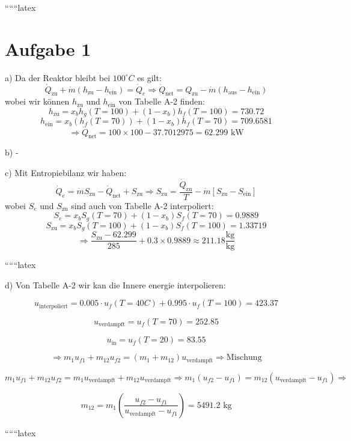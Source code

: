 
``````latex


\section*{Aufgabe 1}

a) Da der Reaktor bleibt bei \(100^\circ C\) es gilt:
\[
\dot{Q}_{\text{zu}} + \dot{m} (h_{\text{zu}} - h_{\text{ein}}) = \dot{Q}_e \Rightarrow \dot{Q}_{\text{net}} = Q_{\text{zu}} - \dot{m} (h_{\text{aus}} - h_{\text{ein}})
\]
wobei wir können \(h_{\text{zu}}\) und \(h_{\text{ein}}\) von Tabelle A-2 finden:
\[
h_{\text{zu}} = x_b h_g (T = 100) + (1 - x_b) h_f (T = 100) = 730.72
\]
\[
h_{\text{ein}} = x_b (h_f (T = 70)) + (1 - x_b) h_f (T = 70) = 709.6581
\]
\[
\Rightarrow \dot{Q}_{\text{net}} = 100 \times 100 - 37.7012975 = \boxed{62.299 \text{ kW}}
\]

b) -

c) Mit Entropiebilanz wir haben:
\[
\dot{Q}_e = \dot{m} S_{\text{zu}} - \dot{Q}_{\text{net}} + S_{\text{zu}} \Rightarrow S_{\text{zu}} = \frac{\dot{Q}_{\text{zu}}}{T} - \dot{m} [S_{\text{zu}} - S_{\text{ein}}]
\]
wobei \(S_e\) und \(S_{\text{zu}}\) sind auch von Tabelle A-2 interpoliert:
\[
S_e = x_b S_g (T = 70) + (1 - x_b) S_f (T = 70) = 0.9889
\]
\[
S_{\text{zu}} = x_b S_g (T = 100) + (1 - x_b) S_f (T = 100) = 1.33719
\]
\[
\Rightarrow \frac{S_{\text{zu}} - 62.299}{285} + 0.3 \times 0.9889 \approx 211.18 \frac{\text{kg}}{\text{kg}}
\]

``````latex


d) Von Tabelle A-2 wir kan die Innere energie interpolieren:

\[
u_{\text{interpoliert}} = 0.005 \cdot u_f (T=40C) + 0.995 \cdot u_f (T=100) = 423.37
\]


\[
u_{\text{verdampft}} = u_f (T=70) = 252.85
\]

\[
u_{\text{in}} = u_f (T=20) = 83.55
\]

\[
\Rightarrow m_1 u_{f1} + m_{12} u_{f2} = (m_1 + m_{12}) u_{\text{verdampft}} \Rightarrow \text{Mischung}
\]

\[
m_1 u_{f1} + m_{12} u_{f2} = m_1 u_{\text{verdampft}} + m_{12} u_{\text{verdampft}} \Rightarrow m_1 (u_{f2} - u_{f1}) = m_{12} (u_{\text{verdampft}} - u_{f1}) \Rightarrow
\]

\[
m_{12} = m_1 \left( \frac{u_{f2} - u_{f1}}{u_{\text{verdampft}} - u_{f1}} \right) = \boxed{5491.2 \text{ kg}}
\]

``````latex



